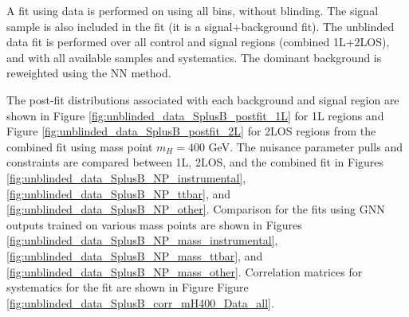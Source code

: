 A fit using data is performed on using all bins, without blinding. The signal sample is also included in the fit (it is a signal+background fit). The unblinded data fit is performed over all control and signal regions (combined 1L+2LOS), and with all available samples and systematics. The dominant \ttbar background is reweighted using the NN method.

The post-fit distributions associated with each background and signal region are shown in Figure \ref{fig:unblinded_data_SplusB_postfit_1L} for 1L regions and Figure \ref{fig:unblinded_data_SplusB_postfit_2L} for 2LOS regions from the combined fit using mass point $m_H=400$ GeV. The nuisance parameter pulls and constraints are compared between 1L, 2LOS, and the combined fit in Figures \ref{fig:unblinded_data_SplusB_NP_instrumental}, \ref{fig:unblinded_data_SplusB_NP_ttbar}, and \ref{fig:unblinded_data_SplusB_NP_other}. Comparison for the fits using GNN outputs trained on various mass points are shown in Figures \ref{fig:unblinded_data_SplusB_NP_mass_instrumental}, \ref{fig:unblinded_data_SplusB_NP_mass_ttbar}, and \ref{fig:unblinded_data_SplusB_NP_mass_other}. Correlation matrices for systematics for the fit are shown in Figure Figure \ref{fig:unblinded_data_SplusB_corr_mH400_Data_all}.

